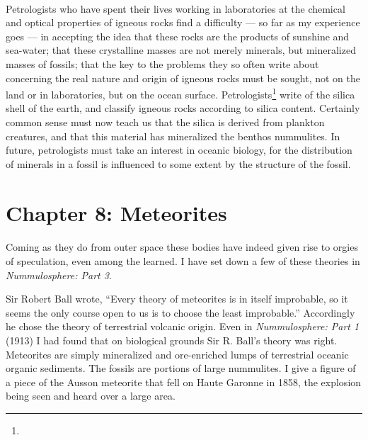 \documentclass[a4paper, 12pt, oneside]{article}
\begin{document}
\paragraph{}
Petrologists who have spent their lives working in laboratories at the chemical and optical properties of igneous rocks find a difficulty --- so far as my experience goes --- in accepting the idea that these rocks are the products of sunshine and sea-water; that these crystalline masses are not merely minerals, but mineralized masses of fossils; that the key to the problems they so often write about concerning the real nature and origin of igneous rocks must be sought, not on the land or in laboratories, but on the ocean surface. Petrologists\footnote{} write of the silica shell of the earth, and classify igneous rocks according to silica content. Certainly common sense must now teach us that the silica is derived from plankton creatures, and that this material has mineralized the benthos nummulites. In future, petrologists must take an interest in oceanic biology, for the distribution of minerals in a fossil is influenced to some extent by the structure of the fossil.
\clearpage
\section{Chapter 8: Meteorites}
\paragraph{}
Coming as they do from outer space these bodies have indeed given rise to orgies of speculation, even among the learned. I have set down a few of these theories in \emph{Nummulosphere: Part 3}.

Sir Robert Ball wrote, ``Every theory of meteorites is in itself improbable, so it seems the only course open to us is to choose the least improbable.'' Accordingly he chose the theory of terrestrial volcanic origin. Even in \emph{Nummulosphere: Part 1} (1913) I had found that on biological grounds Sir R. Ball's theory was right. Meteorites are simply mineralized and ore-enriched lumps of terrestrial oceanic organic sediments. The fossils are portions of large nummulites. I give a figure of a piece of the Ausson meteorite that fell on Haute Garonne in 1858, the explosion being seen and heard over a large area.
\end{document}
